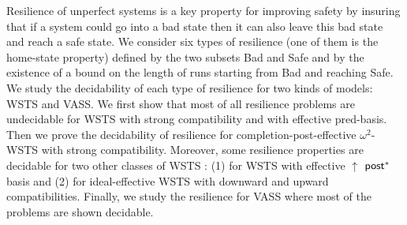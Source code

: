 \noindent
Resilience of unperfect systems is a key property for improving safety by insuring that if a system could go into a bad state then it can also leave this bad state and reach a safe state.
We consider six types of resilience (one of them is the home-state property) defined by the two subsets Bad and Safe and by the existence of a bound on the length of runs starting from Bad and reaching Safe. We study the decidability of each type of resilience for two kinds of models: WSTS and VASS. We first show that most of all resilience problems are undecidable for WSTS with strong compatibility and with effective pred-basis. Then we prove the decidability of resilience for completion-post-effective $\omega^2$-WSTS with strong compatibility. Moreover, some resilience properties are decidable for two other classes of WSTS : (1) for WSTS with effective 
$\uparrow$ $\textsf{post}^*$ basis and (2) for ideal-effective WSTS with downward and upward compatibilities. Finally, we study the resilience for VASS where most of the problems are shown decidable.








